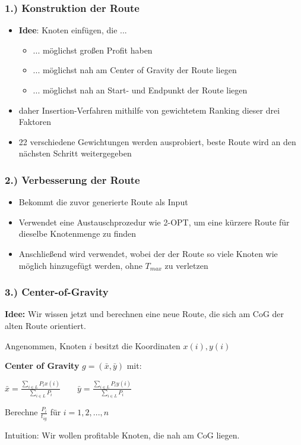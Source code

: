 \documentclass{beamer}
\begin{document}
\begin{frame}
  \frametitle{1.) Konstruktion der Route}
  \begin{itemize}
    \item \textbf{Idee}: Knoten einfügen, die ...
    \begin{itemize}
        \item ... möglichst großen Profit haben
        \item ... möglichst nah am Center of Gravity der Route liegen
        \item ... möglichst nah an Start- und Endpunkt der Route liegen
    \end{itemize}
    \item daher Insertion-Verfahren mithilfe von gewichtetem Ranking dieser drei Faktoren
    \item 22 verschiedene Gewichtungen werden ausprobiert, beste Route wird an den nächsten Schritt weitergegeben
  \end{itemize}
\end{frame}

\begin{frame}
  \frametitle{2.) Verbesserung der Route}
  \begin{itemize}
    \item Bekommt die zuvor generierte Route als Input
    \item Verwendet eine Austauschprozedur wie \textsc{2-OPT}, um eine kürzere Route für dieselbe Knotenmenge zu finden
    \item Anschließend wird  verwendet, wobei der der Route so viele Knoten wie möglich hinzugefügt werden,
    ohne $T_{max}$ zu verletzen
  \end{itemize}
\end{frame}

\begin{frame}
  \frametitle{3.) Center-of-Gravity}
  \textbf{Idee:} Wir wissen jetzt  und berechnen eine neue Route, die sich am CoG der alten Route orientiert.

  Angenommen, Knoten $i$ besitzt die Koordinaten $x(i), y(i)$\newline
  
  \textbf{Center of Gravity} $g = (\bar{x}, \bar{y})$ mit:\newline

  $\bar{x} = \frac{\sum_{i \in L} P_i x(i)}{\sum_{i \in L} P_i} \quad\quad
  \bar{y} = \frac{\sum_{i \in L} P_i y(i)}{\sum_{i \in L} P_i}$\newline

  Berechne $\frac{P_i}{t_{ig}}$ für $i = 1, 2, ..., n$\newline
  
  Intuition: Wir wollen profitable Knoten, die nah am CoG liegen.
\end{frame}
\end{document}
